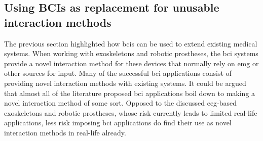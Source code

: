 
\subsection{Using BCIs as replacement for unusable interaction methods}
\label{subsec:bci_common_use_cases_bcis_replace_unusable_interaction}

The previous section highlighted how \glspl{bci} can be used to extend existing medical systems.
When working with exoskeletons and robotic prostheses, the \gls{bci} systems provide a novel interaction method for these devices that normally rely on \gls{emg} or other sources for input.
Many of the successful \gls{bci} applications consist of providing novel interaction methods with existing systems.
It could be argued that almost all of the literature proposed \gls{bci} applications boil down to making a novel interaction method of some sort.
Opposed to the discussed \gls{eeg}-based exoskeletons and robotic prostheses, whose risk currently leads to limited real-life applications, less risk imposing \gls{bci} applications do find their use as novel interaction methods in real-life already.

